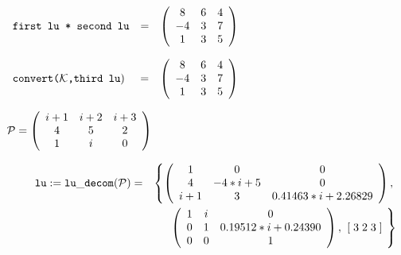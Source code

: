 \vspace*{0.1in}

\begin{flushleft}  
\hspace*{0.1in}
\begin{math}  
\begin{array}{ccc}
${\tt first lu * second lu}$ & = & 
        \left( \begin{array}{ccc} 8 & 6 & 4 \\ -4 & 3 & 7 \\ 1 & 3 & 5
 \end{array} \right) 
\end{array}
\end{math}  
\end{flushleft}

\begin{flushleft}  
\hspace*{0.1in}
\begin{math}  
\begin{array}{ccc}
${\tt convert(${\cal K}$,third lu}$) \hspace*{0.055in} & = & 
        \left( \begin{array}{ccc} 8 & 6 & 4 \\ -4 & 3 & 7 \\ 1 & 3 & 5
 \end{array} \right) 
\end{array}
\end{math}  
\end{flushleft}

\vspace*{0.5in}

\begin{flushleft}
\hspace*{0.175in}
\begin{math}  
{\cal P} = \left( \begin{array}{ccc} i+1 & i+2 & i+3 \\ 4 & 5 & 2 \\ 1 
& i & 0
\end{array} \right)
\end{math}  
\end{flushleft}

\begin{eqnarray}
\hspace*{0.22in}
{\tt lu} := {\tt lu\_decom}({\cal P}) & = & 
\left\{ 
        \left( \begin{array}{ccc} 1 & 0 & 0 \\ 4 & -4*i+5 & 0 \\ i+1 & 
3 & 0.41463*i+2.26829 \end{array} \right), \right. \nonumber \\ & & 
\left. \: \; \,  \left( \begin{array}{ccc} 1 & i & 0 \\ 0 & 1 & 
0.19512*i+0.24390 \\ 0 & 0 & 1 \end{array} \right), \hspace*{0.05in} 
[\; 3 \; 2 \; 3 \;] \hspace*{0.05in}
\right\} \nonumber
\end{eqnarray}

